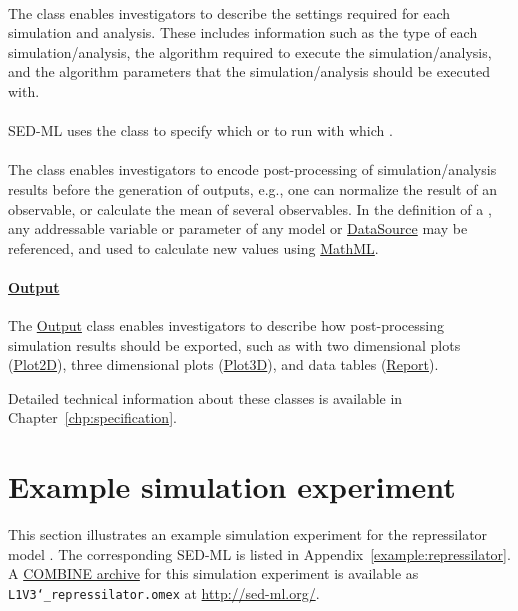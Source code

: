 \paragraph*{\Simulation}
The \Simulation class enables investigators to describe the settings required for each simulation and analysis. These includes information such as the type of each simulation/analysis, the algorithm required to execute the simulation/analysis, and the algorithm parameters that the simulation/analysis should be executed with.

\paragraph*{\AbstractTask}
SED-ML uses the \AbstractTask class to specify which \Simulation or \FitExperiment to run with which \Model.

\paragraph*{\DataGenerator}
The \DataGenerator class enables investigators to encode post-processing of simulation/analysis results before the generation of outputs, e.g., one can normalize the result of an observable, or calculate the mean of several observables. In the definition of a \DataGenerator, any addressable variable or parameter of any model or \hyperref[class:dataSource]{DataSource} may be referenced, and used to calculate new values using \hyperref[sec:mathML]{MathML}.

\paragraph*{\hyperref[class:output]{Output}}
The \hyperref[class:output]{Output} class enables investigators to describe how post-processing simulation results should be exported, such as with two dimensional plots (\hyperref[class:plot2D]{Plot2D}), three dimensional plots (\hyperref[class:plot3D]{Plot3D}), and data tables (\hyperref[class:report]{Report}).

Detailed technical information about these classes is available in Chapter~\ref{chp:specification}. 

\section{Example simulation experiment}
\label{motivation:example}
This section illustrates an example simulation experiment for the repressilator model \citep{Elowitz:2000}. The corresponding SED-ML is listed in Appendix~\ref{example:repressilator}. A \hyperref[sec:archive]{COMBINE archive} for this simulation experiment is available as \texttt{L1V3\char`_repressilator.omex} at \url{http://sed-ml.org/}.

